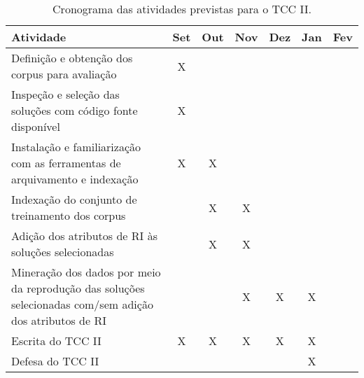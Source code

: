 \begin{table}[!thb]
    \centering
    \caption{Cronograma das atividades previstas para o TCC II.}
    \begin{adjustbox}{max width=0.75\textwidth}
    \begin{tabular}{p{6.5cm}|c|c|c|c|c|c}
        \toprule
        \textbf{Atividade}
        & Set & Out & Nov & Dez & Jan & Fev
        \\ \hline
        Definição e obtenção dos corpus para avaliação 
        & X   &     &     &     &     &          
        \\ \hline
        Inspeção e seleção das soluções com código fonte disponível
        & X   &     &     &     &     &          
        \\ \hline
        Instalação e familiarização com as ferramentas de arquivamento e indexação
        & X   & X   &     &     &     &          
        \\ \hline
        Indexação do conjunto de treinamento dos corpus
        &     & X   & X   &     &     &          
        \\ \hline
        Adição dos atributos de RI às soluções selecionadas
        &     & X   & X   &     &     &    
        \\ \hline
        Mineração dos dados por meio da reprodução das soluções selecionadas com/sem adição dos atributos de RI
        &     &     & X   & X   & X   &  
        \\ \hline
        Escrita do TCC II                       
        & X   & X   & X   & X   & X   &         
        \\ \hline
        Defesa do TCC II                        
        &     &     &     &     & X   &        
        \\
        \bottomrule
    \end{tabular}
    \end{adjustbox}
    
    \label{tab:cronograma} 
\end{table}